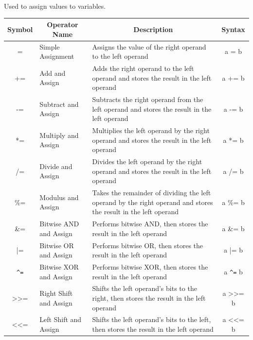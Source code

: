 Used to assign values to variables.
\begin{center}
    \begin{tabular}{|c|l|p{8cm}|c|}
        \hline
        \multicolumn{1}{|c|}{\textbf{Symbol}} &
        \multicolumn{1}{c|}{\textbf{Operator Name}} &
        \multicolumn{1}{c|}{\textbf{Description}} &
        \multicolumn{1}{c|}{\textbf{Syntax}} \\ \hline
        =   & Simple Assignment & Assigns the value of the right operand to the left operand & a = b \\ \hline
        +=  & Add and Assign    & Adds the right operand to the left operand and stores the result in the left operand & a += b \\ \hline
        -=  & Subtract and Assign & Subtracts the right operand from the left operand and stores the result in the left operand & a -= b \\ \hline
        *=  & Multiply and Assign & Multiplies the left operand by the right operand and stores the result in the left operand & a *= b \\ \hline
        /=  & Divide and Assign & Divides the left operand by the right operand and stores the result in the left operand & a /= b \\ \hline
        \%=  & Modulus and Assign & Takes the remainder of dividing the left operand by the right operand and stores the result in the left operand & a \%= b \\ \hline
        \&=  & Bitwise AND and Assign & Performs bitwise AND, then stores the result in the left operand & a \&= b \\ \hline
        |=  & Bitwise OR and Assign & Performs bitwise OR, then stores the result in the left operand & a |= b \\ \hline
        \verb|^=|  & Bitwise XOR and Assign & Performs bitwise XOR, then stores the result in the left operand & a \verb|^=| b \\ \hline
        >>= & Right Shift and Assign & Shifts the left operand’s bits to the right, then stores the result in the left operand & a >>= b \\ \hline
        <<= & Left Shift and Assign & Shifts the left operand’s bits to the left, then stores the result in the left operand & a <<= b \\ \hline
    \end{tabular}
\end{center}

